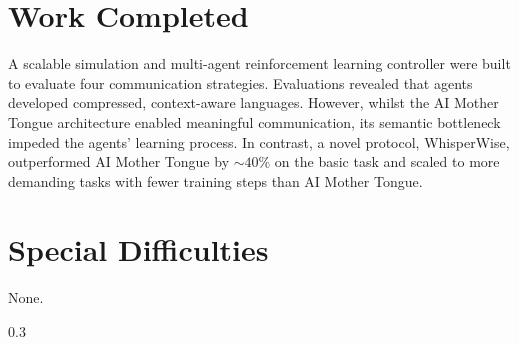 \documentclass[12pt,a4paper,twoside,openright]{report}
\begin{document}
\section*{Work Completed}


A scalable simulation and multi-agent reinforcement learning controller were built to evaluate four communication strategies.
Evaluations revealed that agents developed compressed, context-aware languages.
However, whilst the AI Mother Tongue architecture enabled meaningful communication, its semantic bottleneck impeded the agents' learning process.
In contrast, a novel protocol, WhisperWise, outperformed AI Mother Tongue by $\sim 40\%$ on the basic task and scaled to more demanding tasks with fewer training steps than AI Mother Tongue.

\section*{Special Difficulties}

None.

\newpage 

\begingroup
\begin{spacing}{0.3}
\hypersetup{linkcolor=black}
\tableofcontents
\end{spacing}
\endgroup



\newpage
{}
\setcounter{page}{1}


\end{document}
